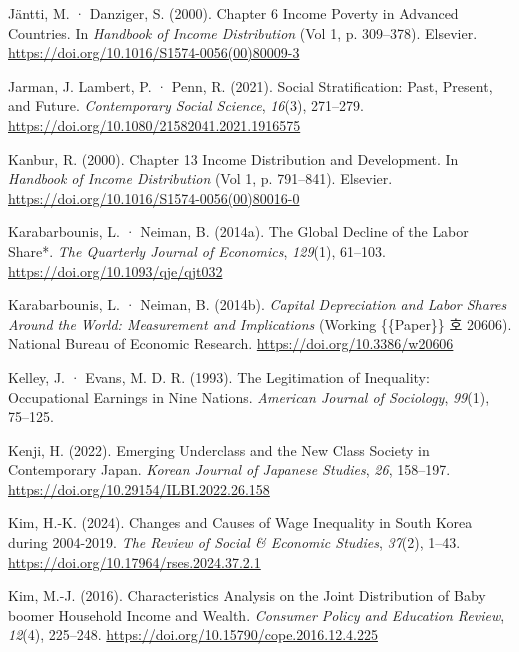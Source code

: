 \documentclass[
  letterpaper,
  DIV=11,
  numbers=noendperiod]{scrartcl}
\newlength{\cslhangindent}
\newenvironment{CSLReferences}[2] %
 {\begin{list}{}{%
  \setlength{\itemindent}{0pt}
  \setlength{\leftmargin}{0pt}
  \setlength{\parsep}{0pt}
  \ifodd #1
   \setlength{\leftmargin}{\cslhangindent}
   \setlength{\itemindent}{-1\cslhangindent}
  \fi
  \setlength{\itemsep}{#2\baselineskip}}}
 {\end{list}}
\begin{document}
\begin{CSLReferences}{1}{0}
Jäntti, M. · Danziger, S. (2000). Chapter 6 {Income} Poverty in Advanced
Countries. In \emph{Handbook of {Income Distribution}} (Vol 1, p.
309--378). Elsevier. \url{https://doi.org/10.1016/S1574-0056(00)80009-3}

Jarman, J. Lambert, P. · Penn, R. (2021). Social Stratification: Past,
Present, and Future. \emph{Contemporary Social Science}, \emph{16}(3),
271--279. \url{https://doi.org/10.1080/21582041.2021.1916575}

Kanbur, R. (2000). Chapter 13 {Income} Distribution and Development. In
\emph{Handbook of {Income Distribution}} (Vol 1, p. 791--841). Elsevier.
\url{https://doi.org/10.1016/S1574-0056(00)80016-0}

Karabarbounis, L. · Neiman, B. (2014a). The {Global Decline} of the
{Labor Share}*. \emph{The Quarterly Journal of Economics},
\emph{129}(1), 61--103. \url{https://doi.org/10.1093/qje/qjt032}

Karabarbounis, L. · Neiman, B. (2014b). \emph{Capital {Depreciation} and
{Labor Shares Around} the {World}: {Measurement} and {Implications}}
(Working \{\{Paper\}\} 호 20606). National Bureau of Economic Research.
\url{https://doi.org/10.3386/w20606}

Kelley, J. · Evans, M. D. R. (1993). The {Legitimation} of {Inequality}:
{Occupational Earnings} in {Nine Nations}. \emph{American Journal of
Sociology}, \emph{99}(1), 75--125.

Kenji, H. (2022). {Emerging Underclass and the New Class Society in
Contemporary Japan}. \emph{Korean Journal of Japanese Studies},
\emph{26}, 158--197. \url{https://doi.org/10.29154/ILBI.2022.26.158}

Kim, H.-K. (2024). {Changes and Causes of Wage Inequality in South Korea
during 2004-2019}. \emph{The Review of Social \& Economic Studies},
\emph{37}(2), 1--43. \url{https://doi.org/10.17964/rses.2024.37.2.1}

Kim, M.-J. (2016). {Characteristics Analysis on the Joint Distribution
of Baby boomer Household Income and Wealth}. \emph{Consumer Policy and
Education Review}, \emph{12}(4), 225--248.
\url{https://doi.org/10.15790/cope.2016.12.4.225}


\end{CSLReferences}
\end{document}
